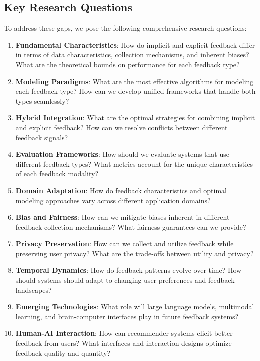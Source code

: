 \documentclass[acmsmall,review,anonymous]{acmart}
\begin{document}
\subsection{Key Research Questions}
\label{subsec:research_questions}

To address these gaps, we pose the following comprehensive research questions:

\begin{enumerate}
    \item \textbf{Fundamental Characteristics}: How do implicit and explicit feedback differ in terms of data characteristics, collection mechanisms, and inherent biases? What are the theoretical bounds on performance for each feedback type?

    \item \textbf{Modeling Paradigms}: What are the most effective algorithms for modeling each feedback type? How can we develop unified frameworks that handle both types seamlessly?

    \item \textbf{Hybrid Integration}: What are the optimal strategies for combining implicit and explicit feedback? How can we resolve conflicts between different feedback signals?

    \item \textbf{Evaluation Frameworks}: How should we evaluate systems that use different feedback types? What metrics account for the unique characteristics of each feedback modality?

    \item \textbf{Domain Adaptation}: How do feedback characteristics and optimal modeling approaches vary across different application domains?

    \item \textbf{Bias and Fairness}: How can we mitigate biases inherent in different feedback collection mechanisms? What fairness guarantees can we provide?

    \item \textbf{Privacy Preservation}: How can we collect and utilize feedback while preserving user privacy? What are the trade-offs between utility and privacy?

    \item \textbf{Temporal Dynamics}: How do feedback patterns evolve over time? How should systems should adapt to changing user preferences and feedback landscapes?

    \item \textbf{Emerging Technologies}: What role will large language models, multimodal learning, and brain-computer interfaces play in future feedback systems?

    \item \textbf{Human-AI Interaction}: How can recommender systems elicit better feedback from users? What interfaces and interaction designs optimize feedback quality and quantity?
\end{enumerate}
\end{document}
